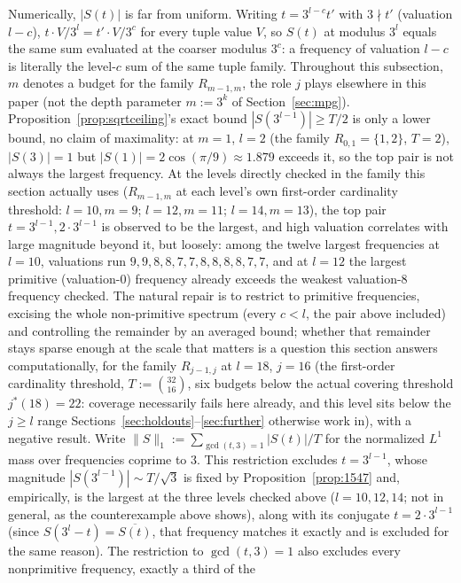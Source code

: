 \documentclass[11pt]{amsart}
\theoremstyle{plain}
\theoremstyle{definition}
\theoremstyle{remark}
\begin{document}
Numerically, $|S(t)|$ is far from uniform. Writing $t=3^{l-c}t'$ with $3\nmid t'$ (valuation
$l-c$), $t\cdot V/3^l=t'\cdot V/3^c$ for every tuple value $V$, so $S(t)$ at modulus $3^l$ equals the
same sum evaluated at the coarser modulus $3^c$: a frequency of valuation $l-c$ is literally the
level-$c$ sum of the same tuple family. Throughout this subsection, $m$ denotes a budget for the
family $R_{m-1,m}$, the role $j$ plays elsewhere in this paper (not the depth parameter $m:=3^k$
of Section~\ref{sec:mpg}). Proposition~\ref{prop:sqrtceiling}'s exact bound
$|S(3^{l-1})|\ge T/2$ is only a lower bound, no claim of maximality: at $m=1$, $l=2$ (the family
$R_{0,1}=\{1,2\}$, $T=2$), $|S(3)|=1$ but $|S(1)|=2\cos(\pi/9)\approx1.879$ exceeds it, so the top
pair is not always the largest frequency. At the levels directly checked in the family this section
actually uses ($R_{m-1,m}$
at each level's own first-order cardinality threshold: $l=10,m=9$;
$l=12,m=11$; $l=14,m=13$), the top pair $t=3^{l-1},2\cdot3^{l-1}$ is observed to be the largest, and
high valuation correlates with large magnitude beyond it, but loosely: among the twelve
largest frequencies at $l=10$, valuations run $9,9,8,8,7,7,8,8,8,8,7,7$, and at $l=12$ the largest
primitive (valuation-$0$) frequency already exceeds the weakest valuation-$8$ frequency checked. The
natural
repair is to restrict to primitive frequencies, excising the whole non-primitive spectrum (every
$c<l$, the pair above included) and controlling the remainder by an averaged bound;
whether that remainder stays
sparse enough at the scale that matters is a question this section answers computationally, for the family $R_{j-1,j}$ at $l=18$,
$j=16$ (the first-order cardinality threshold, $T:=\binom{32}{16}$, six budgets below the actual
covering threshold $j^*(18)=22$: coverage necessarily fails here already, and this level sits below
the $j\ge l$ range Sections~\ref{sec:holdouts}--\ref{sec:further} otherwise work in), with a negative
result. Write
$\|S\|_1:=\sum_{\gcd(t,3)=1}|S(t)|/T$ for the normalized $L^1$ mass over frequencies coprime to $3$.
This restriction excludes $t=3^{l-1}$, whose magnitude $|S(3^{l-1})|\sim T/\sqrt3$ is fixed by
Proposition~\ref{prop:1547} and, empirically, is the largest at the three levels checked above
($l=10,12,14$; not in general, as the counterexample above shows), along with its
conjugate $t=2\cdot3^{l-1}$ (since
$S(3^l-t)=\overline{S(t)}$, that frequency matches it exactly and is excluded for the same reason).
The restriction to $\gcd(t,3)=1$ also excludes every nonprimitive frequency, exactly a third of the
\end{document}
